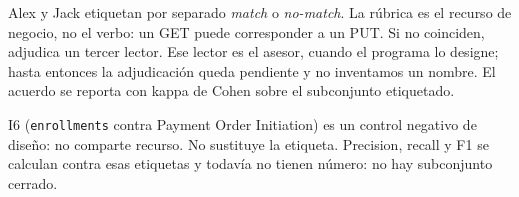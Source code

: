 Alex y Jack etiquetan por separado \textit{match} o \textit{no-match}. La rúbrica es el recurso
de negocio, no el verbo: un GET puede corresponder a un PUT. Si no coinciden, adjudica un
tercer lector. Ese lector es el asesor, cuando el programa lo designe; hasta entonces la
adjudicación queda pendiente y no inventamos un nombre. El acuerdo se reporta con kappa de
Cohen sobre el subconjunto etiquetado.

I6 (\texttt{enrollments} contra Payment Order Initiation) es un control negativo de diseño:
no comparte recurso. No sustituye la etiqueta. Precision, recall y F1 se calculan contra esas
etiquetas y todavía no tienen número: no hay subconjunto cerrado.
